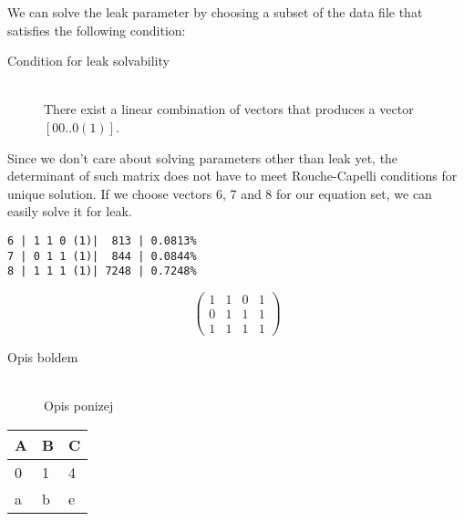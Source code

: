 \documentclass{article}
\begin{document}
We can solve the leak parameter by choosing a subset of the data file that satisfies the following condition:

\begin{description}
	\item[Condition for leak solvability] \hfill \\
        There exist a linear combination of vectors that produces a vector $[0 0 .. 0 (1)]$.
\end{description}

Since we don't care about solving parameters other than leak yet, the determinant of such matrix does not have to meet Rouche-Capelli conditions for unique solution.
If we choose vectors 6, 7 and 8 for our equation set, we can easily solve it for leak.
\begin{verbatim}
6 | 1 1 0 (1)|  813 | 0.0813%
7 | 0 1 1 (1)|  844 | 0.0844%
8 | 1 1 1 (1)| 7248 | 0.7248%
\end{verbatim}

\begin{equation}
    \begin{pmatrix}
        1 & 1 & 0 & 1 \\
        0 & 1 & 1 & 1 \\
        1 & 1 & 1 & 1
    \end{pmatrix} 
\end{equation}

\begin{description}
	\item[Opis boldem] \hfill \\
	Opis ponizej
\end{description}

\begin{longtable}{|l|l||p{2cm}|}
	\hline
	A & B & C\\\hline\hline
	0 & 1 & 4\\\hline
	a & b & e\\\hline
\end{longtable}


\end{document}
